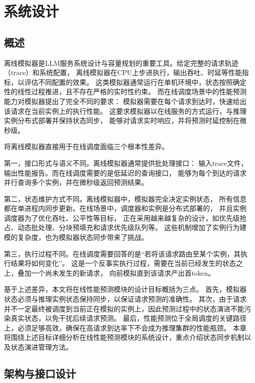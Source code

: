 
\chapter{系统设计}
\label{ch:design}

\section{概述}
离线模拟器是LLM服务系统设计与容量规划的重要工具。给定完整的请求轨迹（trace）和系统配置，
离线模拟器在CPU上步进执行，输出吞吐、时延等性能指标，以评估不同配置的效果。
这类模拟器通常运行在单机环境中，状态按照确定性的线性过程推进，且不存在严格的实时性约束。
而在线调度场景中的性能预测能力对模拟器提出了完全不同的要求：
模拟器需要在每个请求到达时，快速给出该请求在当前实例上的执行性能。
这要求模拟器以在线服务的方式运行，与推理实例分布式部署并保持状态同步，
能够对请求实时响应，并将预测时延控制在微秒级。

将离线模拟器直接用于在线调度面临三个根本性差异。

第一，接口形式与语义不同。离线模拟器通常提供批处理接口：
输入trace文件，输出性能报告。而在线调度需要的是低延迟的查询接口，
能够为每个到达的请求并行查询多个实例，并在微秒级返回预测结果。

第二，状态维护方式不同。离线模拟器中，模拟器完全决定实例状态，
所有信息都在单进程内同步更新。在线场景中，调度器和实例是分布式部署的，
并且实例调度器为了优化吞吐、公平性等目标，
正在采用越来越复杂的设计，如优先级抢占、动态批处理、分块预填充和请求优先级队列等。
这些机制增加了实例行为建模的复杂度，也为模拟器状态同步带来了挑战。

第三，执行过程不同。在线调度需要回答的是“若将该请求路由至某个实例，其执行结果将如何变化”。
这是一个反事实执行过程，需要在当前已经发生的状态之上，叠加一个尚未发生的新请求，
向前模拟直到该请求产出首token。

基于上述差异，本文将在线性能预测模块的设计目标概括为三点。
首先，模拟器状态必须与推理实例状态保持同步，以保证请求预测的准确性。
其次，由于请求并不一定最终被调度到当前正在模拟的实例上，因此预测过程中的状态演进不能污染真实状态，以免干扰后续请求预测。
最后，性能预测位于全局调度的关键路径上，必须足够高效，确保在高请求到达率下不会成为推理集群的性能瓶颈。
本章将围绕上述目标详细分析在线性能预测模块的系统设计，重点介绍状态同步机制以及状态演进管理方法。

\section{架构与接口设计}

